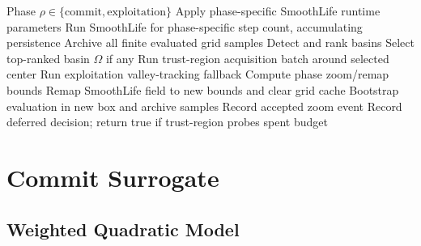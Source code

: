 \documentclass[11pt]{article}
\begin{document}
\begin{algorithm}
\caption{One AGSLS decision round}
\begin{algorithmic}[1]
\Require Phase $\rho\in\{\mathrm{commit},\mathrm{exploitation}\}$
\State Apply phase-specific SmoothLife runtime parameters
\State Run SmoothLife for phase-specific step count, accumulating persistence
\State Archive all finite evaluated grid samples
\State Detect and rank basins
\State Select top-ranked basin $\Omega$ if any
    \State Run trust-region acquisition batch around selected center
    \State Run exploitation valley-tracking fallback
\EndIf
\State Compute phase zoom/remap bounds
    \State Remap SmoothLife field to new bounds and clear grid cache
    \State Bootstrap evaluation in new box and archive samples
    \State Record accepted zoom event
\Else
    \State Record deferred decision; return true if trust-region probes spent budget
\EndIf
\end{algorithmic}
\label{alg:decision-round}
\end{algorithm}

\section{Commit Surrogate}

\subsection{Weighted Quadratic Model}
\end{document}
